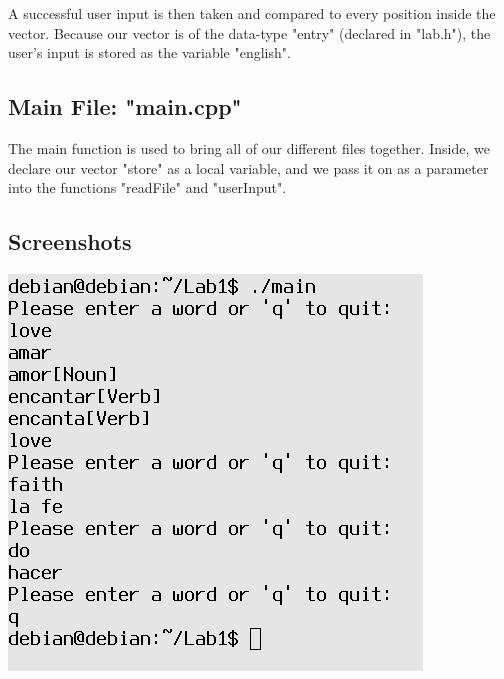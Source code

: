 \documentclass{article}
\begin{document}
A successful user input is then taken and compared to every position
inside the vector. Because our vector is of the data-type "entry" 
(declared in "lab.h"), the user's input is stored as the variable 
"english".  
\clearpage
\subsection{Main File: "main.cpp"}
The main function is used to bring all of our different files
together. Inside, we declare our vector "store" as a local variable,
and we pass it on as a parameter into the functions "readFile" and
"userInput".
\clearpage
\subsection{Screenshots}
\includegraphics[scale=.8]{test1.png}
\end{document}
